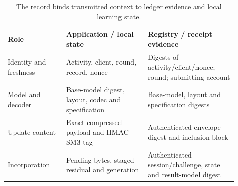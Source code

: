 \begin{table}[!htb]\centering\small
\caption{The record binds transmitted context to ledger evidence and local learning state.}\label{tab:uploadfields}
\setlength{\tabcolsep}{4pt}
\begin{tabular}{p{0.23\linewidth}p{0.32\linewidth}p{0.35\linewidth}}\toprule
Role & Application / local state & Registry / receipt evidence\\\midrule
Identity and freshness & Activity, client, round, record, nonce & Digests of activity/client/nonce; round; submitting account\\
Model and decoder & Base-model digest, layout, codec and specification & Base-model, layout and specification digests\\
Update content & Exact compressed payload and HMAC-SM3 tag & Authenticated-envelope digest and inclusion block\\
Incorporation & Pending bytes, staged residual and generation & Authenticated session/challenge, state and result-model digest\\\bottomrule
\end{tabular}
\end{table}
